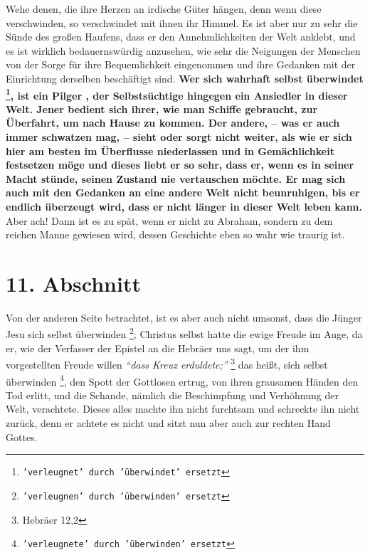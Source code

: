  Wehe denen, die ihre Herzen an irdische Güter hängen, denn
wenn diese
verschwinden, so verschwindet mit ihnen ihr Himmel.  Es ist
aber nur zu sehr die
Sünde des großen Haufens, dass er den Annehmlichkeiten der Welt anklebt, und es
ist wirklich bedauernswürdig anzusehen, wie sehr die Neigungen der Menschen von
der Sorge für ihre Bequemlichkeit eingenommen und ihre Gedanken mit der
Einrichtung derselben beschäftigt sind. \textbf{Wer sich wahrhaft selbst
überwindet \footnote{\texttt{'verleugnet' durch 'überwindet' ersetzt}}, ist
ein Pilger , der Selbstsüchtige hingegen ein Ansiedler in dieser
Welt. Jener
bedient sich ihrer, wie man Schiffe gebraucht, zur Überfahrt, um nach Hause zu
kommen. Der andere, -- was er auch immer schwatzen mag, -- sieht oder sorgt
nicht weiter, als wie er sich hier am besten im Überflusse niederlassen und in
Gemächlichkeit festsetzen möge und dieses liebt er so sehr, dass er, wenn es in
seiner Macht stünde, seinen Zustand nie vertauschen möchte. Er mag sich auch mit
den Gedanken an eine andere Welt nicht beunruhigen, bis er endlich überzeugt
wird, dass er nicht länger in dieser Welt leben kann.} Aber ach! Dann ist es zu
spät, wenn er nicht zu Abraham, sondern zu dem reichen Manne gewiesen wird,
dessen Geschichte eben so wahr wie traurig ist.

\section{11. Abschnitt} \label{kap4_ab11}


Von der anderen Seite betrachtet, ist es aber auch nicht umsonst, dass die Jünger
Jesu sich selbst überwinden \footnote{\texttt{'verleugnen' durch 'überwinden'
ersetzt}}; Christus selbst hatte die ewige Freude im Auge, da er,
wie der Verfasser der Epistel an die Hebräer uns sagt, um der ihm vorgestellten
Freude willen
\textit{"`dass Kreuz erduldete;"'}
\footnote{Hebräer 12,2}
das heißt, sich
selbst überwinden \footnote{\texttt{'verleugnete' durch 'überwinden' ersetzt}}, den
Spott der Gottlosen ertrug, von ihren grausamen Händen
den Tod erlitt, und die Schande, nämlich die Beschimpfung und Verhöhnung der
Welt, verachtete. Dieses alles machte ihn nicht furchtsam und schreckte ihn
nicht zurück, denn er achtete es nicht und sitzt nun aber auch zur rechten Hand
Gottes.

\medskip


